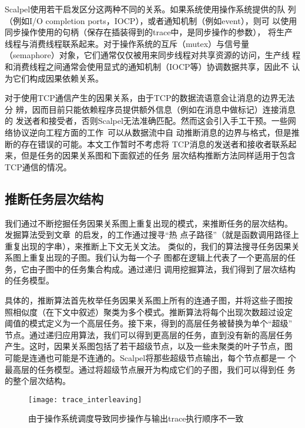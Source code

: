 Scalpel使用若干启发区分这两种不同的关系。如果系统使用操作系统提供的队
列（例如I/O completion ports，IOCP），或者通知机制（例如event），则可
以使用同步操作使用的句柄（保存在插装得到的trace中，是同步操作的参数），
将生产线程与消费线程联系起来。对于操作系统的互斥（mutex）与信号量
（semaphore）对象，它们通常仅仅被用来同步线程对共享资源的访问，生产线
程和消费线程之间通常会使用显式的通知机制（IOCP等）协调数据共享，因此不
认为它们构成因果依赖关系。

对于使用TCP通信产生的因果关系，由于TCP的数据流语意会让消息的边界无法分
辨，因而目前只能依赖程序员提供额外信息（例如在消息中做标记）连接消息的
发送者和接受者，否则Scalpel无法准确匹配。然而这会引入手工干预。一些网
络协议逆向工程方面的工作~\cite{Caballero2007, Cui2007}可以从数据流中自
动推断消息的边界与格式，但是推断的存在错误的可能。本文工作暂时不考虑将
TCP消息的发送者和接收者联系起来，但是任务的因果关系图和下面叙述的任务
层次结构推断方法同样适用于包含TCP通信的情况。

\subsection{推断任务层次结构}

我们通过不断挖掘任务因果关系图上重复出现的模式，来推断任务的层次结构。
发掘算法受到文章~\cite{wpp}的启发，的工作通过搜寻“热
点子路径”（就是函数调用路径上重复出现的字串），来推断上下文无关文法。
类似的，我们的算法搜寻任务因果关系图上重复出现的子图。我们认为每一个子
图都在逻辑上代表了一个更高层的任务，它由子图中的任务集合构成。通过递归
调用挖掘算法，我们得到了层次结构的任务模型。

具体的，推断算法首先枚举任务因果关系图上所有的连通子图，并将这些子图按
照相似度（在下文中叙述）聚类为多个模式。推断算法将每个出现次数超过设定
阈值的模式定义为一个高层任务。接下来，得到的高层任务被替换为单个“超级”
节点。通过递归应用算法，我们可以得到更高层的任务，直到没有新的高层任务
产生。这时，因果关系图包括了若干超级节点，以及一些未聚类的叶子节点，图
可能是连通也可能是不连通的。Scalpel将那些超级节点输出，每个节点都是一
个最高层的任务模型。通过将超级节点展开为构成它们的子图，我们可以得到任
务的整个层次结构。

\begin{figure}
  \centering
  \begin{minipage}{0.8\linewidth}
    \centering
    \texttt{[image: trace\_interleaving]}
    \caption{由于操作系统调度导致同步操作与输出trace执行顺序不一致}
    \label{fig:trace_interleaving}
  \end{minipage}
\end{figure}

